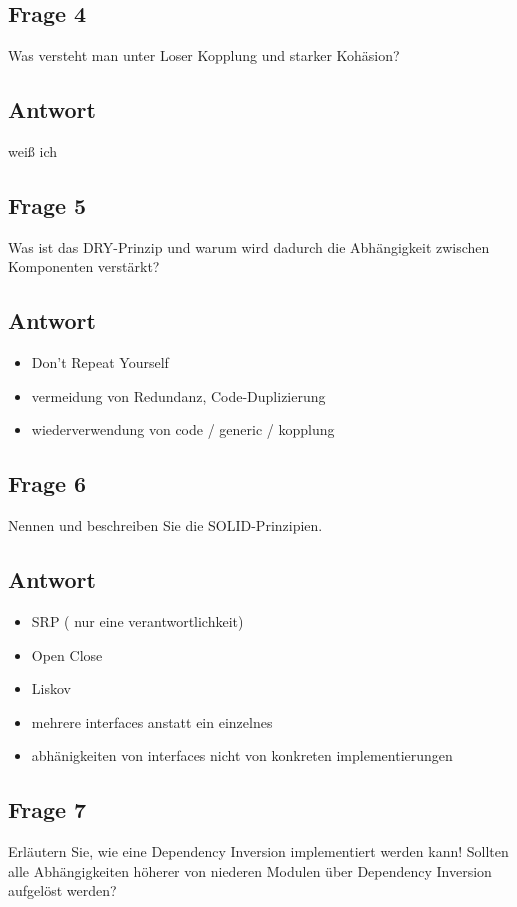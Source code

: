 \subsection*{Frage 4}
Was versteht man unter Loser Kopplung und starker Kohäsion?
\subsection*{Antwort}
weiß ich

\subsection*{Frage 5}
Was ist das DRY-Prinzip und warum wird dadurch die Abhängigkeit zwischen Komponenten verstärkt?
\subsection*{Antwort}
\begin{itemize}
	\item Don't Repeat Yourself
	\item vermeidung von Redundanz, Code-Duplizierung
	\item wiederverwendung von code / generic / kopplung
\end{itemize}

\subsection*{Frage 6}
Nennen und beschreiben Sie die SOLID-Prinzipien.
\subsection*{Antwort}
\begin{itemize}
	\item SRP ( nur eine verantwortlichkeit)
	\item Open Close
	\item Liskov
	\item mehrere interfaces anstatt ein einzelnes
	\item abhänigkeiten von interfaces nicht von konkreten implementierungen
\end{itemize}

\subsection*{Frage 7}
Erläutern Sie, wie eine Dependency Inversion implementiert werden kann! Sollten alle Abhängigkeiten höherer von niederen Modulen über Dependency Inversion aufgelöst werden?
